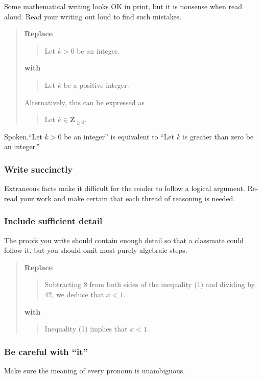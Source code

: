 \documentclass[12pt]{article}
\newcounter{ex}\setcounter{ex}{0}
\newcounter{id}\setcounter{id}{0}
\newcounter{se}\setcounter{se}{0}
\begin{document}
Some mathematical writing looks OK in print, but it is nonsense when read
aloud.  Read your writing out loud to find such mistakes.

\begin{quote}
\textbf{Replace}
\begin{quote}
  Let \(k > 0\) be an integer.
\end{quote}
\textbf{with}
\begin{quote}
  Let \(k\) be a positive integer.
\end{quote}
Alternatively,  this can be expressed as
\begin{quote}
  Let \(k \in \mathbf{Z}_ {\geq 0}.\)
\end{quote}
\end{quote}
Spoken,``Let \(k > 0\) be an integer'' is equivalent to
``Let \(k\) is greater than zero  be an integer.''



 \subsubsection{  Write succinctly}  

Extraneous facts make it difficult for the reader to follow a logical
argument.  Re-read your work and make certain that each thread of
reasoning is needed.

 \subsubsection{  Include sufficient detail}  

The proofs you write should contain enough detail so that a 
classmate could  follow it, but you should omit most purely algebraic 
steps. 

\begin{quote}
\textbf{Replace}
\begin{quote}
Subtracting 8 from both sides of the inequality (1)  and dividing by 42,
we deduce that \(x < 1\).
\end{quote}
\textbf{with}
\begin{quote}
Inequality (1) implies that \(x < 1\).
\end{quote}
\end{quote}

 \subsubsection{ Be careful with ``it''}

Make sure the meaning of every pronoun is unambiguous.
\end{document}
